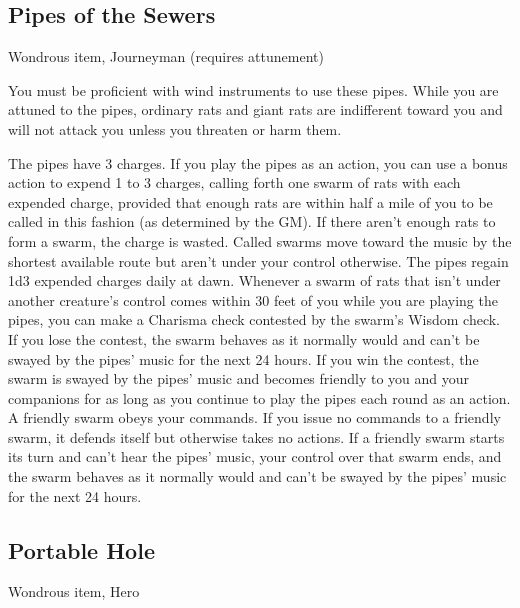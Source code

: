 \subsection{Pipes of the Sewers}
Wondrous item, Journeyman (requires attunement)

You must be proficient with wind instruments to use these pipes. While you are attuned to the pipes, ordinary rats and giant rats are indifferent toward you and will not attack you unless you threaten or harm them.

The pipes have 3 charges. If you play the pipes as an action, you can use a bonus action to expend 1 to 3 charges, calling forth one swarm of rats with each expended charge, provided that enough rats are within half a mile of you to be called in this fashion (as determined by the GM). If there aren't enough rats to form a swarm, the charge is wasted. Called swarms move toward the music by the shortest available route but aren't under your control otherwise. The pipes regain 1d3 expended charges daily at dawn.  Whenever a swarm of rats that isn't under another creature's control comes within 30 feet of you while you are playing the pipes, you can make a Charisma check contested by the swarm's Wisdom check. If you lose the contest, the swarm behaves as it normally would and can't be swayed by the pipes' music for the next 24 hours. If you win the contest, the swarm is swayed by the pipes' music and becomes friendly to you and your companions for as long as you continue to play the pipes each round as an action. A friendly swarm obeys your commands. If you issue no commands to a friendly swarm, it defends itself but otherwise takes no actions. If a friendly swarm starts its turn and can't hear the pipes' music, your control over that swarm ends, and the swarm behaves as it normally would and can't be swayed by the pipes' music for the next 24 hours.

\subsection{Portable Hole}
Wondrous item, Hero 

